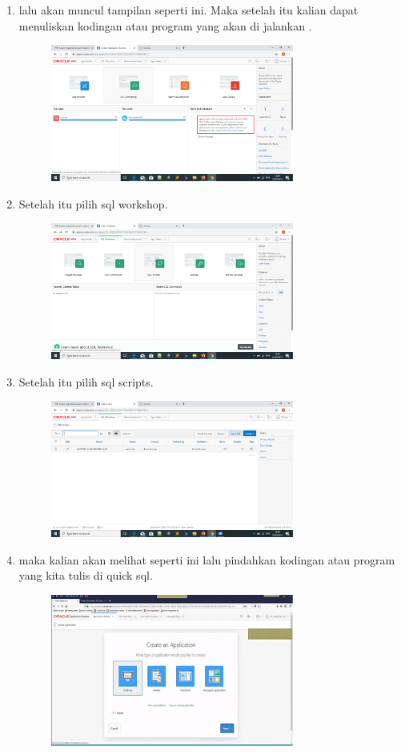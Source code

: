 \documentclass{article}
\begin{document}
\begin{enumerate}
\begin{figure}[h]
\end{figure}
\item lalu akan muncul tampilan seperti ini.  Maka setelah itu kalian dapat menuliskan kodingan atau program yang akan di jalankan .
\begin{figure}[h]
\centerline{\includegraphics[width=8cm]{figure/c.png}}
\end{figure}
\newpage\item Setelah itu pilih sql workshop.  
\begin{figure}[h]
\centerline{\includegraphics[width=8cm]{figure/d.png}}
            \end{figure}
\item Setelah itu pilih sql scripts.  
               \begin{figure}[h]
\centerline{\includegraphics[width=8cm]{figure/e.png}}
            \end{figure}
\newpage \item  maka kalian akan melihat seperti ini lalu pindahkan kodingan atau program yang kita tulis di quick sql.  
               \begin{figure}[h]
\centerline{\includegraphics[width=8cm]{figure/f.png}}

\end{figure}
\end{enumerate}
\end{document}
